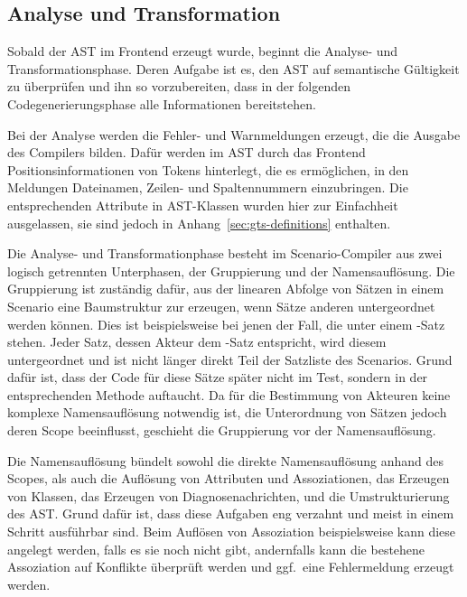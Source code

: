
\subsection{Analyse und Transformation}\label{subsec:data-model-gentreesrc}

Sobald der AST im Frontend erzeugt wurde, beginnt die Analyse- und Transformationsphase.
Deren Aufgabe ist es, den AST auf semantische Gültigkeit zu überprüfen und ihn so vorzubereiten,
dass in der folgenden Codegenerierungsphase alle Informationen bereitstehen.

Bei der Analyse werden die Fehler- und Warnmeldungen erzeugt, die die Ausgabe des Compilers bilden.
Dafür werden im AST durch das Frontend Positionsinformationen von Tokens hinterlegt, die es ermöglichen,
in den Meldungen Dateinamen, Zeilen- und Spaltennummern einzubringen.
Die entsprechenden Attribute in AST-Klassen wurden hier zur Einfachheit ausgelassen,
sie sind jedoch in Anhang~\ref{sec:gts-definitions} enthalten.

Die Analyse- und Transformationphase besteht im Scenario-Compiler aus zwei logisch getrennten Unterphasen,
der Gruppierung und der Namensauflösung.
Die Gruppierung ist zuständig dafür, aus der linearen Abfolge von Sätzen in einem Scenario eine Baumstruktur zur erzeugen,
wenn Sätze anderen untergeordnet werden können.
Dies ist beispielsweise bei jenen der Fall, die unter einem -Satz stehen.
Jeder Satz, dessen Akteur dem -Satz entspricht, wird diesem untergeordnet und ist nicht länger direkt Teil der Satzliste des Scenarios.
Grund dafür ist, dass der Code für diese Sätze später nicht im Test, sondern in der entsprechenden Methode auftaucht.
Da für die Bestimmung von Akteuren keine komplexe Namensauflösung notwendig ist,
die Unterordnung von Sätzen jedoch deren Scope beeinflusst, geschieht die Gruppierung vor der Namensauflösung.

Die Namensauflösung bündelt sowohl die direkte Namensauflösung anhand des Scopes,
als auch die Auflösung von Attributen und Assoziationen, das Erzeugen von Klassen, das Erzeugen von Diagnosenachrichten,
und die Umstrukturierung des AST\@.
Grund dafür ist, dass diese Aufgaben eng verzahnt und meist in einem Schritt ausführbar sind.
Beim Auflösen von Assoziation beispielsweise kann diese angelegt werden, falls es sie noch nicht gibt,
andernfalls kann die bestehene Assoziation auf Konflikte überprüft werden und ggf.\ eine Fehlermeldung erzeugt werden.

